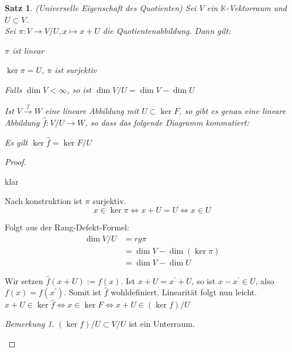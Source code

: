 \documentclass[12pt,a4paper]{article}
\newtheorem{theorem}{Satz}
\theoremstyle{definition}
\theoremstyle{remark}
\newtheorem*{remark}{Bemerkung}
\renewcommand{\hat}[1]{\widehat{#1}}
\begin{document}
	\begin{theorem}{(Universelle Eigenschaft des Quotienten)}
		Sei $V$ ein $\mathbb{K}$-Vektorraum und $U \subset V$. \\
		Sei $\pi: V \rightarrow V/U, x \mapsto x+U$ die Quotientenabbildung. Dann gilt:
		\begin{proofenum}
			\item $\pi$ ist linear
			\item $\ker \pi = U$, $\pi$ ist surjektiv
			\item Falls $\dim V < \infty$, so ist $\dim V/U=\dim V-\dim U$
			\item Ist $V \xrightarrow{f} W$ eine lineare Abbildung mit $U \subset \ker F$, so gibt es genau eine lineare Abbildung $\hat{f}: V/U \rightarrow W$, so dass das folgende Diagramm kommutiert:
			\begin{center}
			\end{center}
			Es gilt $\ker \hat{f}=\ker F/U$
		\end{proofenum}
	\end{theorem}
	\begin{proof}
		\begin{proofenum}
			\item klar
			\item Nach konstruktion ist $\pi$ surjektiv. \\
				\begin{equation}
					x \in \ker \pi \Leftrightarrow x+U = U \Leftrightarrow x \in U 
				\end{equation}
			\item
				Folgt aus der Rang-Defekt-Formel:
				\begin{equation}
					\begin{split}
						\dim V/U &= rg \pi \\
						&= \dim V-\dim (\ker \pi) \\
						&= \dim V-\dim U
					\end{split}
				\end{equation}
			\item Wir setzen $\hat{f}(x+U):=f(x)$. Ist $x+U = x^{'}+U$, so ist $x-x^{'} \in U$, also $f(x)=f(x^{'})$. Somit ist $\hat{f}$ wohldefiniert. Linearität folgt nun leicht. \\
			$x+U \in \ker \hat{f} \Leftrightarrow x \in \ker F \Leftrightarrow x+U \in (\ker f)/U$
			\begin{remark}
				$(\ker f)/U \subset V/U$ ist ein Unterraum.
			\end{remark}
		\end{proofenum}
	\end{proof}
\end{document}

